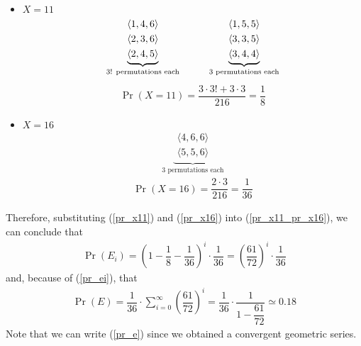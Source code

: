 \begin{itemize}
	\item $X = 11$
	\begin{align*}
		\underbrace{
			\begin{aligned}
				\langle 1,4,6 \rangle\\
				\langle 2,3,6 \rangle\\
				\langle 2,4,5 \rangle
			\end{aligned}
		}_{\text{3! permutations each}}
		\hspace{10mm}
		\underbrace{
			\begin{aligned}
				\langle 1,5,5 \rangle\\
				\langle 3,3,5 \rangle\\
				\langle 3,4,4 \rangle
			\end{aligned}
		}_{\text{3 permutations each}}
	\end{align*}
	\begin{align}
		\Pr(X = 11) = \dfrac{3 \cdot 3! + 3 \cdot 3}{216} = \dfrac{1}{8} \label{pr_x11}
	\end{align}
	
	\item $X = 16$
	\begin{align*}
		\underbrace{
			\begin{aligned}
				\langle 4,6,6 \rangle\\
				\langle 5,5,6 \rangle
			\end{aligned}
		}_{\text{3 permutations each}}
	\end{align*}
	\begin{align}
		\Pr(X = 16) = \dfrac{2 \cdot 3}{216} = \dfrac{1}{36} \label{pr_x16}
	\end{align}
\end{itemize}
Therefore, substituting (\ref{pr_x11}) and (\ref{pr_x16}) into (\ref{pr_x11_pr_x16}), we can conclude that
\begin{align}
	\Pr(E_i) = \left( 1 - \dfrac{1}{8} - \dfrac{1}{36} \right)^i \cdot \dfrac{1}{36} = \left( \dfrac{61}{72} \right)^i \cdot \dfrac{1}{36} \label{pr_ei}
\end{align}
and, because of (\ref{pr_ei}), that
\begin{align}
	\Pr(E) = \dfrac{1}{36} \cdot \sum_{i = 0}^{\infty}\left( \dfrac{61}{72} \right)^i = \dfrac{1}{36} \cdot \dfrac{1}{1 - \dfrac{61}{72}} \simeq 0.18 \label{pr_e}
\end{align}
Note that we can write (\ref{pr_e}) since we obtained a convergent geometric series.\\
